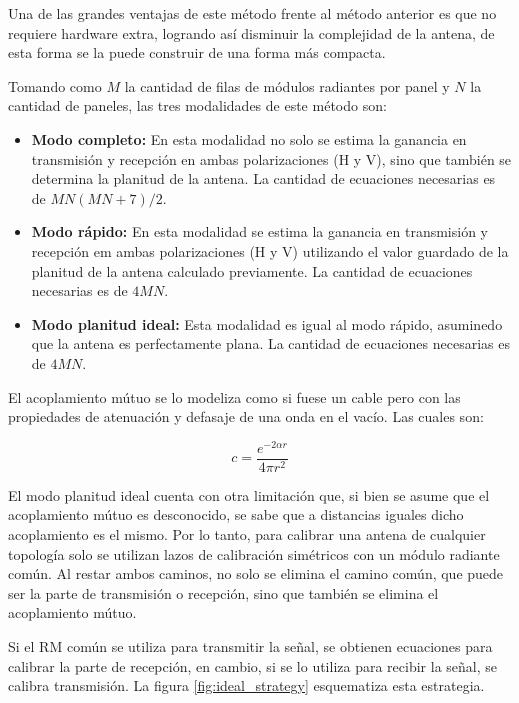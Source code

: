 Una de las grandes ventajas de este método frente al método anterior es que no requiere hardware extra, logrando así 
disminuir la complejidad de la antena, de esta forma se la puede construir de una forma más compacta.

Tomando como $M$ la cantidad de filas de módulos radiantes por panel y $N$ la cantidad de paneles, las tres modalidades de 
este método son:

\begin{itemize}
	\item \textbf{Modo completo:} En esta modalidad no solo se estima la ganancia en transmisión y recepción en ambas 
		polarizaciones (H y V), sino que también se determina la planitud de la antena. La cantidad de ecuaciones necesarias es 
		de $MN(MN + 7)/2$.
	\item \textbf{Modo rápido:} En esta modalidad se estima la ganancia en transmisión y recepción em ambas polarizaciones
		(H y V) utilizando el valor guardado de la planitud de la antena calculado previamente. La cantidad de ecuaciones necesarias
		es de $4MN$.
	\item \textbf{Modo planitud ideal:} Esta modalidad es igual al modo rápido, asuminedo que la antena es perfectamente plana. 
		La cantidad de ecuaciones necesarias es de $4MN$.
\end{itemize}

El acoplamiento mútuo se lo modeliza como si fuese un cable pero con las propiedades de atenuación y defasaje de una onda en
el vacío. Las cuales son:

\begin{equation}
	c = \dfrac{e^{-2\alpha r}}{4\pi r^2}
\end{equation}

El modo planitud ideal cuenta con otra limitación que, si bien se asume que el acoplamiento mútuo es desconocido, se sabe que 
a distancias iguales dicho acoplamiento es el mismo. Por lo tanto, para calibrar una antena de cualquier topología solo se 
utilizan lazos de calibración simétricos con un módulo radiante común. Al restar ambos caminos, no solo se elimina el 
camino común, que puede ser la parte de transmisión o recepción, sino que también se elimina el acoplamiento mútuo.

Si el RM común se utiliza para transmitir la señal, se obtienen ecuaciones para calibrar la parte de recepción, en cambio, 
si se lo utiliza para recibir la señal, se calibra transmisión. La figura \ref{fig:ideal_strategy} esquematiza esta estrategia.

